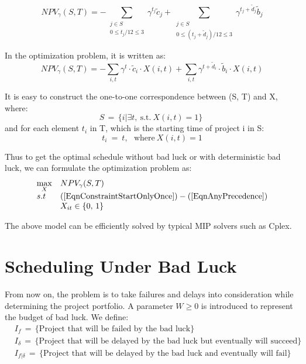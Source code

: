 \documentclass[final,3p,times]{elsarticle}
\begin{document}
	\begin{equation}
		NPV_{\gamma} ( S,T ) = - \sum\limits_{\substack{j \in S\\0 \leq t_j/12 \leq 3}} \gamma^{t_j} \tilde{c}_j + \sum\limits_{\substack{j \in S\\0 \leq (t_j+\tilde{d}_j)/12 \leq 3}} \gamma^{t_j+\tilde{d}_j} \tilde{b}_j
	\end{equation}
	
	In the optimization problem, it is written as:
	\begin{equation}
		NPV_{\gamma} ( S,T ) = - \sum\limits_{i,t} \gamma^t \cdot \tilde{c}_i \cdot X(i,t) + \sum\limits_{i,t} \gamma^{t+\tilde{d}_i} \cdot \tilde{b}_i \cdot X(i,t)
	\end{equation}
	
	It is easy to construct the one-to-one correspondence between (S, T) and X, where:
	\begin{equation}
		S\,=\,\{i | \exists t,~\mbox{s.t.}~X(i,t)=1\}\;
	\end{equation}
	and for each element $t_i$ in T, which is the starting time of project i in S:
	\begin{equation}
		t_i~=~t ,~~~\mbox{where}~ X(i,t)=1
	\end{equation}
	
	Thus to get the optimal schedule without bad luck or with deterministic bad luck, we can formulate the optimization problem as:
	\begin{equation}
		\begin{array}{ll}
			\max\limits_{X} &NPV_\gamma(S,T)\\
			s.t &(\ref{EqnConstraintStartOnlyOnce}) -(\ref{EqnAnyPrecedence})\\
			& X_{it} \in \{0,\,1\}
		\end{array}
	\end{equation}
	
	The above model can be efficiently solved by typical MIP solvers such as Cplex.

\section{Scheduling Under Bad Luck}
	From now on, the problem is to take failures and delays into consideration while determining the project portfolio. A parameter $W\geq 0$ is introduced to represent the budget of bad luck. We define:
	\begin{align*}
		&I_f\,=\, \{\mbox{Project that will be failed by the bad luck}\}\\
		&I_{\delta}\,=\, \{\mbox{Project that will be delayed by the bad luck but eventually will succeed}\}\\
		&I_{f|\delta}\,=\, \{\mbox{Project that will be delayed by the bad luck and eventually will fail}\}\\
	\end{align*}
	
\end{document}
